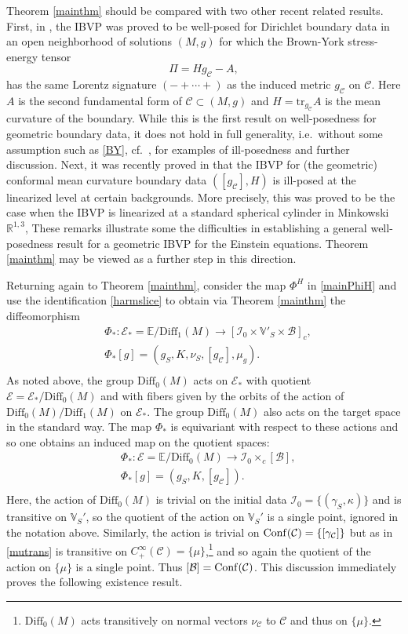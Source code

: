 \documentclass[10pt]{amsart}
\newcommand{\g}{\gamma}
\renewcommand{\k}{\kappa}
\newcommand{\cC}{{\mathcal C}}
\newcommand{\cB}{{\mathcal B}}
\newcommand{\cE}{{\mathcal E}}
\newcommand{\cI}{\mathcal I}
\newcommand{\bR}{\mathbb R}
\newcommand{\bE}{\mathbb E}
\newcommand{\bV}{\mathbb V}
\newcommand{\Diff}{\mathrm{Diff}}
\newcommand{\be}{\begin{equation}}
\newcommand{\ee}{\end{equation}}
\newcommand{\tr}{\mathrm{tr}}
\renewcommand{\to}{\rightarrow}
\newcommand{\<}{\langle}
\renewcommand{\>}{\rangle}
\theoremstyle{plain}
\theoremstyle{remark}
\theoremstyle{definition}
\numberwithin{equation}{section}
\begin{document}
    Theorem \ref{mainthm} should be compared with two other recent related results. First, in \cite{I}, the IBVP was proved to be well-posed for Dirichlet boundary 
  data in an open neighborhood of solutions $(M, g)$ for which the Brown-York stress-energy tensor 
  \be \label{BY}
  \Pi = H g_{\cC} - A,
  \ee 
  has the same Lorentz signature $(- + \cdots +)$ as the induced metric $g_{\cC}$ on $\cC$. Here $A$ is the second fundamental form of $\cC \subset (M, g)$ 
  and $H = \tr_{g_{\cC}}A$ is the mean curvature of the boundary. While this is the first result on well-posedness for geometric boundary data, it does not hold in full generality, 
  i.e.~without some assumption such as \eqref{BY}, cf.~\cite{AA2}, \cite{AGM} for examples of ill-posedness and further discussion. Next, it was recently proved in \cite{LRSW} 
  that the IBVP for (the geometric) conformal mean curvature boundary data $([g_{\cC}], H)$ is ill-posed at the linearized level at certain backgrounds. More precisely, 
  this was proved to be the case when the IBVP is linearized at a standard spherical cylinder in Minkowski $\bR^{1,3}$, These remarks illustrate some the 
  difficulties in establishing a general well-posedness result for a geometric IBVP for the Einstein equations. Theorem \ref{mainthm} may be viewed as a 
  further step in this direction.  
  
  \medskip 
   
       Returning again to Theorem \ref{mainthm}, consider the map $\Phi^H$ in \eqref{mainPhiH} and use the identification \eqref{harmslice} to obtain via 
Theorem \ref{mainthm} the 
diffeomorphism
\be \label{Phi1}
\begin{split}
&\Phi_*: \cE_* = \bE/\Diff_1(M) \to [\cI_0 \times \bV'_S \times \cB]_c,\\
&\Phi_* [g] = (g_S, K, \nu_S, [g_{\cC}], \mu_g).\\
\end{split}
\ee
As noted above, the group $\Diff_0(M)$ acts on $\cE_*$ with quotient $\cE = \cE_*/\Diff_0(M)$ and with fibers given by the orbits of the action of 
$\Diff_0(M)/\Diff_1(M)$ on $\cE_*$. The group $\Diff_0(M)$ also acts on the target space in the standard way. The map $\Phi_*$ is 
equivariant with respect to these actions and so one obtains an induced map on the quotient spaces:
\be \label{Phi0}
 \begin{split}
 &\Phi_*: \cE = \bE/\Diff_0(M) \to \cI_0 \times_c [\cB],\\
&\Phi_* [g] = (g_S, K, [g_{\cC}]).\\
\end{split}
\ee
Here, the action of $\Diff_0(M)$ is trivial on the initial data $\cI_0 = \{(\g_S, \k)\}$ and is transitive on $\bV_S'$, so the quotient of the action on $\bV_S'$ is 
a single point, ignored in the notation above. Similarly, the action is trivial on ${\rm Conf}(\cC) = \{[\g_{\cC}]\}$ but as in \eqref{mutrans} is transitive on 
$C_+^{\infty}(\cC) = \{\mu\}$,\footnote{$\Diff_0(M)$ acts transitively on normal vectors $\nu_{\cC}$ to $\cC$ and thus on $\{\mu\}$.}  and so again 
the quotient of the action on $\{\mu\}$ is a single point. Thus $[\cB] = {\rm Conf}(\cC)$. This discussion immediately proves the following existence result. 
\end{document}
